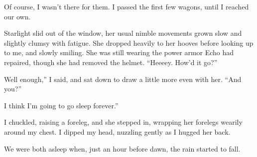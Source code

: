 Of course, I wasn’t there for them. I passed the first few wagons, until I reached our own.

Starlight slid out of the window, her usual nimble movements grown slow and slightly clumsy with fatigue. She dropped heavily to her hooves before looking up to me, and slowly smiling. She was still wearing the power armor Echo had repaired, though she had removed the helmet. “Heeeey. How’d it go?”

\leavevmode{}Well enough,” I said, and sat down to draw a little more even with her. “And you?”

\leavevmode{}I think I’m going to go sleep forever.”

I chuckled, raising a foreleg, and she stepped in, wrapping her forelegs wearily around my chest. I dipped my head, nuzzling gently as I hugged her back.

We were both asleep when, just an hour before dawn, the rain started to fall.